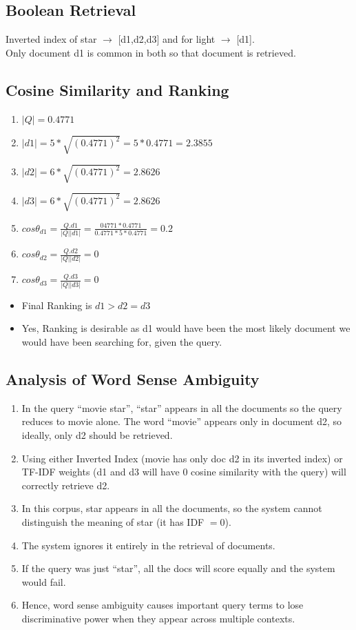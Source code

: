 \subsection{Boolean Retrieval}
Inverted index of star $\rightarrow$ [d1,d2,d3] and for light $\rightarrow$ [d1]. \\
Only document d1 is common in both so that document is retrieved.

\subsection{Cosine Similarity and Ranking}
\begin{enumerate}
    \item $|Q|=0.4771$
    \item $|d1|=5*\sqrt{(0.4771)^2}=5*0.4771=2.3855$
    \item $|d2|=6*\sqrt{(0.4771)^2}=2.8626$
    \item $|d3|=6*\sqrt{(0.4771)^2}=2.8626$
    \item $cos\theta_{d1}=\frac{Q.d1}{|Q||d1|}=\frac{04771*0.4771}{0.4771*5*0.4771}=0.2$
    \item $cos\theta_{d2}=\frac{Q.d2}{|Q||d2|}=0$
    \item $cos\theta_{d3}=\frac{Q.d3}{|Q||d3|}=0$
\end{enumerate}

\begin{itemize}
    \item Final Ranking is $d1>d2=d3$
    \item Yes, Ranking is desirable as d1 would have been the most likely document we would have been searching for, given the query.
\end{itemize}

\subsection{Analysis of Word Sense Ambiguity}
\begin{enumerate}
    \item In the query ``movie star'', ``star'' appears in all the documents so the query reduces to movie alone. The word ``movie'' appears only in document d2, so ideally, only d2 should be retrieved.
    \item Using either Inverted Index (movie has only doc d2 in its inverted index) or TF-IDF weights (d1 and d3 will have 0 cosine similarity with the query) will correctly retrieve d2.
    \item In this corpus, star appears in all the documents, so the system cannot distinguish the meaning of star (it has IDF $=0$).
    \item The system ignores it entirely in the retrieval of documents.
    \item If the query was just ``star'', all the docs will score equally and the system would fail.
    \item Hence, word sense ambiguity causes important query terms to lose discriminative power when they appear across multiple contexts.
\end{enumerate}

